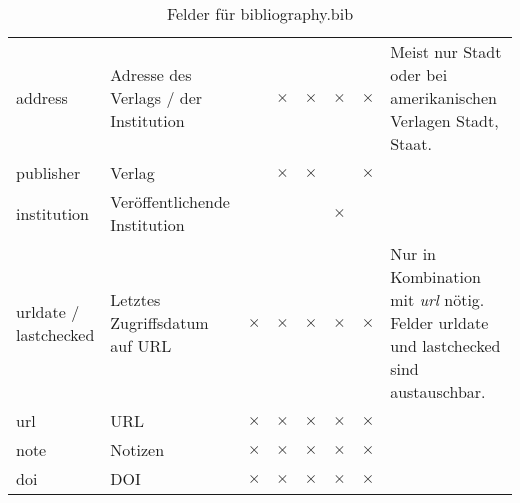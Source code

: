 \begin{table}[ht!]
{\begin{tabular}{l|p{3.5cm}|c|c|c|c|c|p{5.5cm}}
			address & Adresse des Verlags / der Institution & & $\times$ & $\times$ & $\times$ & $\times$ & Meist nur Stadt oder bei amerikanischen Verlagen Stadt, Staat. \\
			publisher & Verlag & & $\times$ & $\times$ & & $\times$ & \\
			institution & Veröffentlichende Institution & & & & $\times$ & & \\
			\makecell[tl]{urldate / \\ lastchecked} & Letztes Zugriffsdatum auf URL & $\times$ & $\times$ & $\times$ & $\times$ & $\times$ & Nur in Kombination mit \emph{url} nötig. Felder urldate und lastchecked sind austauschbar. \\
			url & URL & $\times$ & $\times$ & $\times$ & $\times$ & $\times$ & \\
			note & Notizen & $\times$ & $\times$ & $\times$ & $\times$ & $\times$ & \\
			doi & DOI & $\times$ & $\times$ & $\times$ & $\times$ & $\times$ & \\
		\end{tabular}
	}
	\caption{Felder für bibliography.bib}
	\label{tab:bibentries}
\end{table}